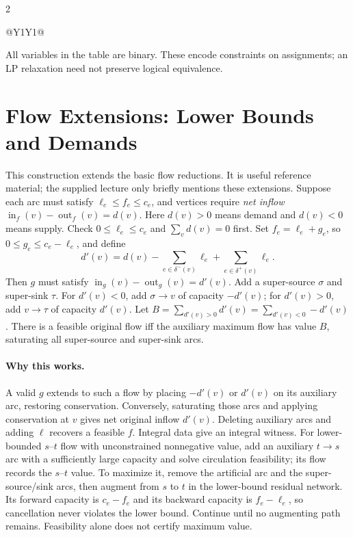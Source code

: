 \documentclass[8pt]{extarticle}
\theoremstyle{definition}
\begin{document}
\begin{multicols*}{2}
\begin{table}[H]
\begin{tabularx}{\linewidth}{@{}Y{1}Y{1}@{}}
\hline
\end{tabularx}

\caption{Generalized Boolean expressions using binary variables.}
\end{table}

All variables in the table are binary. These encode constraints on assignments; an LP relaxation need not preserve logical equivalence.

\section{Flow Extensions: Lower Bounds and Demands}\label{nf:demands}
This construction extends the basic flow reductions. It is useful reference
material; the supplied lecture only briefly mentions these extensions.
Suppose each arc must satisfy $\ell_e\le f_e\le c_e$, and vertices require
\emph{net inflow} $\operatorname{in}_f(v)-\operatorname{out}_f(v)=d(v)$.
Here $d(v)>0$ means demand and $d(v)<0$ means supply. Check
$0\le\ell_e\le c_e$ and $\sum_v d(v)=0$ first.
Set $f_e=\ell_e+g_e$, so $0\le g_e\le c_e-\ell_e$, and define
\[
 d'(v)=d(v)-\sum_{e\in\delta^-(v)}\ell_e
                  +\sum_{e\in\delta^+(v)}\ell_e.
\]
Then $g$ must satisfy $\operatorname{in}_g(v)-\operatorname{out}_g(v)=d'(v)$.
Add a super-source $\sigma$ and super-sink $\tau$. For $d'(v)<0$, add
$\sigma\to v$ of capacity $-d'(v)$; for $d'(v)>0$, add $v\to\tau$ of
capacity $d'(v)$. Let
$B=\sum_{d'(v)>0}d'(v)=\sum_{d'(v)<0}-d'(v)$.
There is a feasible original flow iff the auxiliary maximum flow has value
$B$, saturating all super-source and super-sink arcs.

\paragraph{Why this works.}
A valid $g$ extends to such a flow by placing $-d'(v)$ or $d'(v)$ on its
auxiliary arc, restoring conservation. Conversely, saturating those arcs
and applying conservation at $v$ gives net original inflow $d'(v)$.
Deleting auxiliary arcs and adding $\ell$ recovers a feasible $f$.
Integral data give an integral witness. For lower-bounded $s$--$t$ flow with
unconstrained nonnegative value, add an auxiliary $t\to s$ arc with a
sufficiently large capacity and solve circulation feasibility; its flow
records the $s$--$t$ value. To maximize it, remove the artificial arc and the
super-source/sink arcs, then augment from $s$ to $t$ in the lower-bound residual
network. Its forward capacity is $c_e-f_e$ and its backward capacity is
$f_e-\ell_e$, so cancellation never violates the lower bound. Continue until no
augmenting path remains. Feasibility alone does not certify maximum value.



\end{multicols*}
\end{document}
